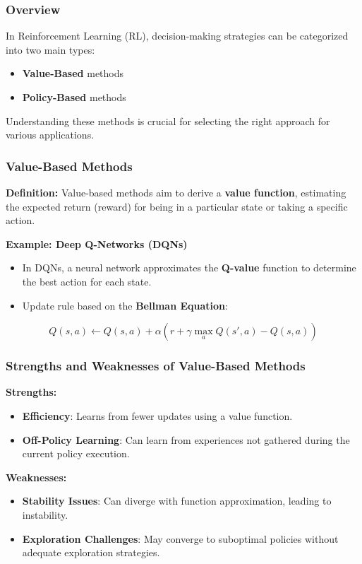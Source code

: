 \documentclass[aspectratio=169]{beamer}
\begin{document}
\begin{frame}[fragile]
    \frametitle{Overview}
    In Reinforcement Learning (RL), decision-making strategies can be categorized into two main types:
    \begin{itemize}
        \item \textbf{Value-Based} methods
        \item \textbf{Policy-Based} methods
    \end{itemize}
    Understanding these methods is crucial for selecting the right approach for various applications.
\end{frame}

\begin{frame}[fragile]
    \frametitle{Value-Based Methods}
    
    \textbf{Definition:} 
    Value-based methods aim to derive a \textbf{value function}, estimating the expected return (reward) for being in a particular state or taking a specific action.
    
    \textbf{Example: Deep Q-Networks (DQNs)}
    \begin{itemize}
        \item In DQNs, a neural network approximates the \textbf{Q-value} function to determine the best action for each state.
        \item Update rule based on the \textbf{Bellman Equation}:
    \end{itemize}
    
    \begin{equation}
    Q(s, a) \leftarrow Q(s, a) + \alpha \left( r + \gamma \max_a Q(s', a) - Q(s, a) \right)
    \end{equation}
\end{frame}

\begin{frame}[fragile]
    \frametitle{Strengths and Weaknesses of Value-Based Methods}

    \textbf{Strengths:}
    \begin{itemize}
        \item \textbf{Efficiency}: Learns from fewer updates using a value function.
        \item \textbf{Off-Policy Learning}: Can learn from experiences not gathered during the current policy execution.
    \end{itemize}

    \textbf{Weaknesses:}
    \begin{itemize}
        \item \textbf{Stability Issues}: Can diverge with function approximation, leading to instability.
        \item \textbf{Exploration Challenges}: May converge to suboptimal policies without adequate exploration strategies.
    \end{itemize}
\end{frame}
\end{document}
